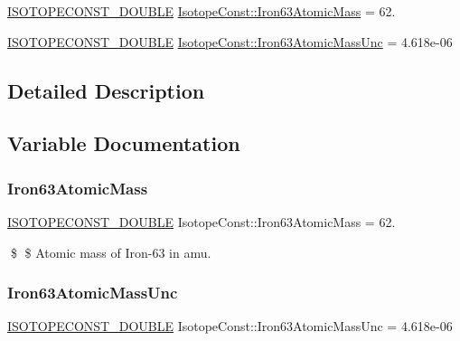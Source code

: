 \begin{DoxyCompactItemize}
\item 
\mbox{\hyperlink{group___isotope_const-_macros_ga8f45a7272ce02c0b4c65c44636ed719a}{I\+S\+O\+T\+O\+P\+E\+C\+O\+N\+S\+T\+\_\+\+D\+O\+U\+B\+LE}} \mbox{\hyperlink{group___isotope_const-_iron-_fe63_ga17c7e4f2949b0ed9975dcffe528e6a16}{Isotope\+Const\+::\+Iron63\+Atomic\+Mass}} = 62.
\item 
\mbox{\hyperlink{group___isotope_const-_macros_ga8f45a7272ce02c0b4c65c44636ed719a}{I\+S\+O\+T\+O\+P\+E\+C\+O\+N\+S\+T\+\_\+\+D\+O\+U\+B\+LE}} \mbox{\hyperlink{group___isotope_const-_iron-_fe63_gadc3094c5e6b43538334700ef56c0fd09}{Isotope\+Const\+::\+Iron63\+Atomic\+Mass\+Unc}} = 4.\+618e-\/06
\end{DoxyCompactItemize}


\subsection{Detailed Description}


\subsection{Variable Documentation}
\mbox{\label{group___isotope_const-_iron-_fe63_ga17c7e4f2949b0ed9975dcffe528e6a16}} 
\subsubsection{\texorpdfstring{Iron63\+Atomic\+Mass}{Iron63AtomicMass}}
{\footnotesize\ttfamily \mbox{\hyperlink{group___isotope_const-_macros_ga8f45a7272ce02c0b4c65c44636ed719a}{I\+S\+O\+T\+O\+P\+E\+C\+O\+N\+S\+T\+\_\+\+D\+O\+U\+B\+LE}} Isotope\+Const\+::\+Iron63\+Atomic\+Mass = 62.}

\$ \$ Atomic mass of Iron-\/63 in amu. \mbox{\label{group___isotope_const-_iron-_fe63_gadc3094c5e6b43538334700ef56c0fd09}} 
\subsubsection{\texorpdfstring{Iron63\+Atomic\+Mass\+Unc}{Iron63AtomicMassUnc}}
{\footnotesize\ttfamily \mbox{\hyperlink{group___isotope_const-_macros_ga8f45a7272ce02c0b4c65c44636ed719a}{I\+S\+O\+T\+O\+P\+E\+C\+O\+N\+S\+T\+\_\+\+D\+O\+U\+B\+LE}} Isotope\+Const\+::\+Iron63\+Atomic\+Mass\+Unc = 4.\+618e-\/06}

